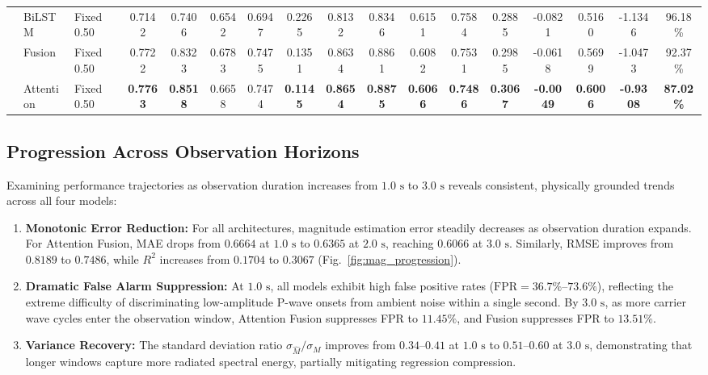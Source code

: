 \documentclass[journal]{IEEEtran}
\begin{document}
\begin{table}[t]
{\begin{tabular}{lllcccccccccccccc}
 & BiLSTM & Fixed 0.50 & 0.7142 & 0.7406 & 0.6542 & 0.6947 & 0.2265 & 0.8132 & 0.8346 & 0.6151 & 0.7584 & 0.2885 & -0.0821 & 0.5160 & -1.1346 & 96.18\% \\
 & Fusion & Fixed 0.50 & 0.7722 & 0.8323 & 0.6783 & 0.7475 & 0.1351 & 0.8634 & 0.8861 & 0.6082 & 0.7531 & 0.2985 & -0.0618 & 0.5699 & -1.0473 & 92.37\% \\
 & Attention & Fixed 0.50 & \textbf{0.7763} & \textbf{0.8518} & 0.6658 & 0.7474 & \textbf{0.1145} & \textbf{0.8654} & \textbf{0.8875} & \textbf{0.6066} & \textbf{0.7486} & \textbf{0.3067} & \textbf{-0.0049} & \textbf{0.6006} & \textbf{-0.9308} & \textbf{87.02\%} \\
\bottomrule
\end{tabular}}
\end{table}

\subsection{Progression Across Observation Horizons}
Examining performance trajectories as observation duration increases from $1.0\text{ s}$ to $3.0\text{ s}$ reveals consistent, physically grounded trends across all four models:
\begin{enumerate}
    \item \textbf{Monotonic Error Reduction:} For all architectures, magnitude estimation error steadily decreases as observation duration expands. For Attention Fusion, MAE drops from $0.6664$ at $1.0\text{ s}$ to $0.6365$ at $2.0\text{ s}$, reaching $0.6066$ at $3.0\text{ s}$. Similarly, RMSE improves from $0.8189$ to $0.7486$, while $R^2$ increases from $0.1704$ to $0.3067$ (Fig.~\ref{fig:mag_progression}).
    \item \textbf{Dramatic False Alarm Suppression:} At $1.0\text{ s}$, all models exhibit high false positive rates ($\text{FPR} = 36.7\%$--$73.6\%$), reflecting the extreme difficulty of discriminating low-amplitude P-wave onsets from ambient noise within a single second. By $3.0\text{ s}$, as more carrier wave cycles enter the observation window, Attention Fusion suppresses FPR to $11.45\%$, and Fusion suppresses FPR to $13.51\%$.
    \item \textbf{Variance Recovery:} The standard deviation ratio $\sigma_{\hat{M}}/\sigma_M$ improves from $0.34$--$0.41$ at $1.0\text{ s}$ to $0.51$--$0.60$ at $3.0\text{ s}$, demonstrating that longer windows capture more radiated spectral energy, partially mitigating regression compression.
\end{enumerate}
\end{document}
